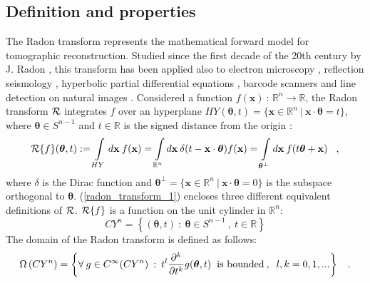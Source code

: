 {\subsection{Definition and properties}
The Radon transform represents the mathematical forward model for tomographic reconstruction.
Studied since the first decade of the 20th century by J. Radon \cite{Radon1986},
this transform has been applied also to electron microscopy \cite{Frank1996}, reflection seismology \cite{Toft1994},
hyperbolic partial differential equations \cite{John1981,Lax1964}, barcode scanners \cite{Tizhoosh2015} and line detection on natural images \cite{Aggarwal2006}.
\newline
Considered a function $f(\mathbf{x})\::\,\mathbb{R}^{n} \longrightarrow \mathbb{R}$, the Radon transform $\operatorname{\mathcal{R}}$ integrates
$f$ over an hyperplane $HY(\boldsymbol{\theta},t) = \{\mathbf{x} \in \mathbb{R}^{n}\:|\: \mathbf{x}\cdot\boldsymbol{\theta} = t\}$, where
$\boldsymbol{\theta} \in S^{n-1}$ and $t \in \mathbb{R}$ is the signed distance from the origin \cite{Natterer2001}:
\begin{equation}
  \operatorname{\mathcal{R}}\{f\}(\boldsymbol{\theta},t) := \int\limits_{HY}d\mathbf{x}\:f(\mathbf{x})
                                      = \int\limits_{\mathbb{R}^{n}}d\mathbf{x}\:\delta(t-\mathbf{x}\cdot\boldsymbol{\theta})f(\mathbf{x})
                                      = \int\limits_{\boldsymbol{\theta}^{\bot}}d\mathbf{x}\:f(t\boldsymbol{\theta} + \mathbf{x}) \hspace{0.3cm},
  \label{radon_transform_1}
\end{equation}
where $\delta$ is the Dirac function and 
$\boldsymbol{\theta}^{\bot} = \{\mathbf{x} \in \mathbb{R}^{n}\:|\:\mathbf{x}\cdot\boldsymbol{\theta} = 0\}$ is the subspace
orthogonal to $\boldsymbol{\theta}$.
(\ref{radon_transform_1}) encloses three different equivalent definitions of $\operatorname{\mathcal{R}}$. $\operatorname{\mathcal{R}}\{f\}$ is a function on the unit cylinder in
$\mathbb{R}^{n}$:
\begin{equation}
  CY^{n} = \left\{ (\boldsymbol{\theta},t)\::\:\boldsymbol{\theta} \in S^{n-1}\:,\:t \in \mathbb{R} \right\}
\end{equation}
The domain of the Radon transform is defined as follows:
\begin{equation}
  \Omega\left(CY^{n}\right) = \left\{ \forall\:g\in C^{\infty}(CY^{n})\::\:
  t^{l}\frac{\partial^{k}}{\partial t^{k}}g(\boldsymbol{\theta},t) \;\; \text{is bounded}\:,\;\;l,k = 0,1,... \right\} \hspace{0.3cm}.
\end{equation}
}
